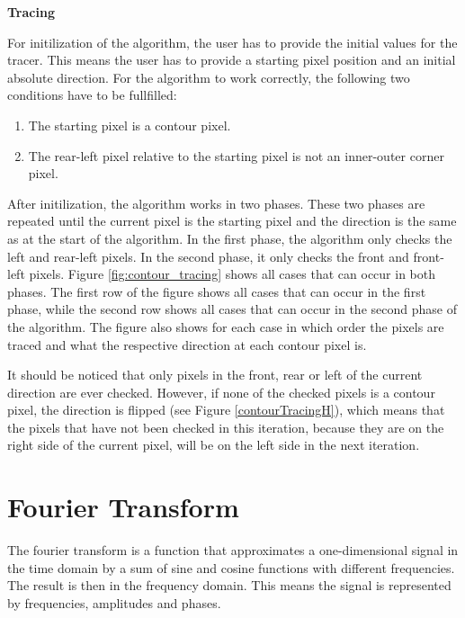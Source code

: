 \documentclass[thesis.tex]{subfiles}
\begin{document}
\textbf{Tracing}

For initilization of the algorithm, the user has to provide the initial values for the tracer. This means the user has to provide a starting pixel position and an initial absolute direction. For the algorithm to work correctly, the following two conditions have to be fullfilled:
\begin{enumerate}
\item{The starting pixel is a contour pixel.}
\item{The rear-left pixel relative to the starting pixel is not an inner-outer corner pixel.}
\label{starting_pixel_conditions}
\end{enumerate}
  
After initilization, the algorithm works in two phases. These two phases are repeated until the current pixel is the starting pixel and the direction is the same as at the start of the algorithm. In the first phase, the algorithm only checks the left and rear-left pixels. In the second phase, it only checks the front and front-left pixels. Figure \ref{fig:contour_tracing} shows all cases that can occur in both phases. The first row of the figure shows all cases that can occur in the first phase, while the second row shows all cases that can occur in the second phase of the algorithm. The figure also shows for each case in which order the pixels are traced and what the respective direction at each contour pixel is.

It should be noticed that only pixels in the front, rear or left of the current direction are ever checked. However, if none of the checked pixels is a contour pixel, the direction is flipped (see Figure \ref{contourTracingH}), which means that the pixels that have not been checked in this iteration, because they are on the right side of the current pixel, will be on the left side in the next iteration.





\section{Fourier Transform} \label{fourier_transform}

The fourier transform \cite{nixon2012feature} is a function that approximates a one-dimensional signal in the time domain by a sum of sine and cosine functions with different frequencies. The result is then in the frequency domain. This means the signal is represented by frequencies, amplitudes and phases.
\end{document}
